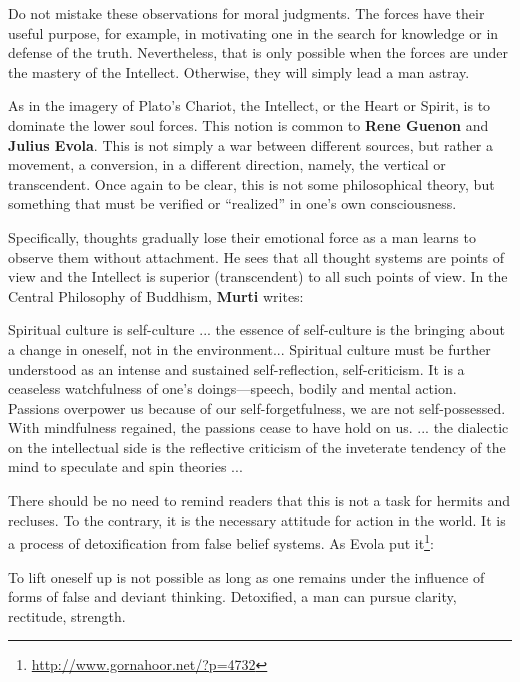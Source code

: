 Do not mistake these observations for moral judgments. The forces have their useful purpose, for example, in motivating one in the search for knowledge or in defense of the truth. Nevertheless, that is only possible when the forces are under the mastery of the Intellect. Otherwise, they will simply lead a man astray.

As in the imagery of Plato's Chariot, the Intellect, or the Heart or Spirit, is to dominate the lower soul forces. This notion is common to \textbf{Rene Guenon} and \textbf{Julius Evola}. This is not simply a war between different sources, but rather a movement, a conversion, in a different direction, namely, the vertical or transcendent. Once again to be clear, this is not some philosophical theory, but something that must be verified or ``realized'' in one's own consciousness.

Specifically, thoughts gradually lose their emotional force as a man learns to observe them without attachment. He sees that all thought systems are points of view and the Intellect is superior (transcendent) to all such points of view. In the Central Philosophy of Buddhism,
\textbf{Murti} writes:


\begin{quotex}
Spiritual culture is self-culture ... the essence of self-culture is the bringing about a change in oneself, not in the environment... Spiritual culture must be further understood as an intense and sustained self-reflection, self-criticism. It is a ceaseless watchfulness of one's doings---speech, bodily and mental action. Passions overpower us because of our self-forgetfulness, we are not self-possessed. With mindfulness regained, the passions cease to have hold on us. ... the dialectic on the intellectual side is the reflective criticism of the inveterate tendency of the mind to speculate and spin theories ... 
\end{quotex}


There should be no need to remind readers that this is not a task for hermits and recluses. To the contrary, it is the necessary attitude for action in the world. It is a process of detoxification from false belief systems. As Evola put it\footnote{\url{http://www.gornahoor.net/?p=4732}}:

\begin{quotex}
To lift oneself up is not possible as long as one remains under the influence of forms of false and deviant thinking. Detoxified, a man can pursue clarity, rectitude, strength.
\end{quotex}



